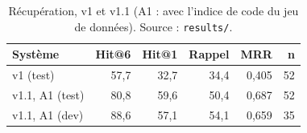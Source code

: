 \begin{table}[H]
\centering
\small
\begin{tabular}{lrrrrr}
\toprule
Système & Hit@6 & Hit@1 & Rappel & MRR & n \\
\midrule
v1 (test) & 57{,}7 & 32{,}7 & 34{,}4 & 0{,}405 & 52 \\
v1.1, A1 (test) & 80{,}8 & 59{,}6 & 50{,}4 & 0{,}687 & 52 \\
v1.1, A1 (dev) & 88{,}6 & 57{,}1 & 54{,}1 & 0{,}659 & 35 \\
\bottomrule
\end{tabular}
\caption{Récupération, v1 et v1.1 (A1 : avec l'indice de code du jeu de données). Source : \texttt{results/}.}
\label{tab:v1v11}
\end{table}
